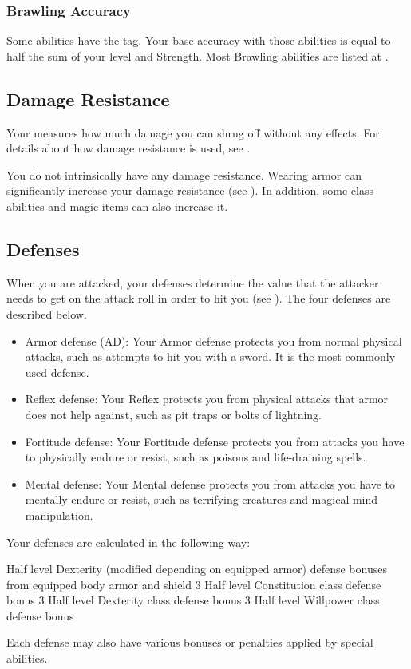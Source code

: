     \subsubsection{Brawling Accuracy}\label{Brawling Accuracy}
      Some abilities have the  tag.
      Your base accuracy with those abilities is equal to half the sum of your level and Strength.
      Most Brawling abilities are listed at .

  \subsection{Damage Resistance}\label{Damage Resistance}
    Your  measures how much damage you can shrug off without any effects.
    For details about how damage resistance is used, see .

    You do not intrinsically have any damage resistance.
    Wearing armor can significantly increase your damage resistance (see ).
    In addition, some class abilities and magic items can also increase it.

  \subsection{Defenses}\label{Defenses}
    When you are attacked, your defenses determine the value that the attacker needs to get on the attack roll in order to hit you (see ).
    The four defenses are described below.
    \begin{itemize}
      \item Armor defense (AD): Your Armor defense protects you from normal physical attacks, such as attempts to hit you with a sword.
        It is the most commonly used defense.
      \item Reflex defense: Your Reflex protects you from physical attacks that armor does not help against, such as pit traps or bolts of lightning.
      \item Fortitude defense: Your Fortitude defense protects you from attacks you have to physically endure or resist, such as poisons and life-draining spells.
      \item Mental defense: Your Mental defense protects you from attacks you have to mentally endure or resist, such as terrifying creatures and magical mind manipulation.
    \end{itemize}

    Your defenses are calculated in the following way:
    \begin{itemize}
       Half level \add Dexterity (modified depending on equipped armor) \add defense bonuses from equipped body armor and shield
       3 \add Half level \add Constitution \add class defense bonus
       3 \add Half level \add Dexterity \add class defense bonus
       3 \add Half level \add Willpower \add class defense bonus
    \end{itemize}
    Each defense may also have various bonuses or penalties applied by special abilities.

